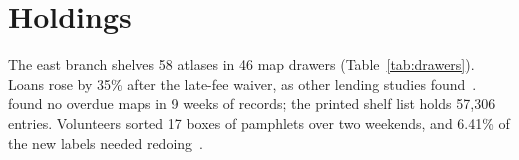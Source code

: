 \section{Holdings}\label{sec:holdings}
The east branch shelves 58 atlases in 46 map drawers (Table~\ref{tab:drawers}).
Loans rose by 35\% after the late-fee waiver, as other lending studies found~\cite{Rowan2017,Tasker2019}.
\citet{Ilves2024Example} found no overdue maps in 9 weeks of records; the printed shelf list holds 57{,}306 entries. %
Volunteers sorted 17 boxes of pamphlets over two weekends, and 6.41\% of the new labels needed redoing~\citep[see][ch.~6]{Okafor2022}.
